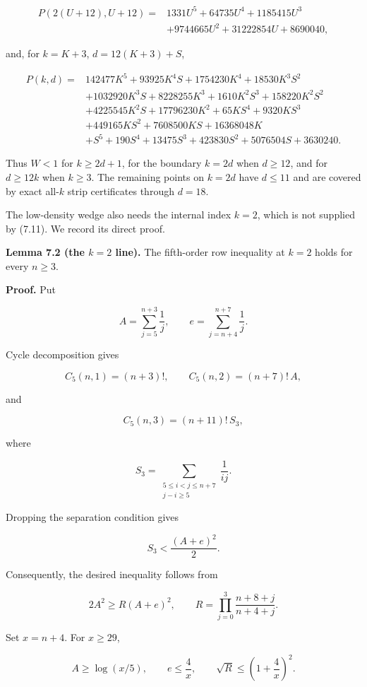 \documentclass[11pt]{article}
\numberwithin{equation}{section}
\begin{document}
\[
\begin{aligned}
P(2(U+12),U+12)
={}&1331U^5+64735U^4+1185415U^3\\
&+9744665U^2+31222854U+8690040,
\end{aligned}
\tag{7.10}
\]

and, for $k=K+3$, $d=12(K+3)+S$,

\[
\begin{aligned}
P(k,d)
={}&142477K^5+93925K^4S+1754230K^4
+18530K^3S^2\\
&+1032920K^3S+8228255K^3+1610K^2S^3
+158220K^2S^2\\
&+4225545K^2S+17796230K^2+65KS^4+9320KS^3\\
&+449165KS^2+7608500KS+16368048K\\
&+S^5+190S^4+13475S^3+423830S^2+5076504S+3630240.
\end{aligned}
\tag{7.11}
\]

Thus $W<1$ for $k\ge2d+1$, for the boundary $k=2d$ when $d\ge12$, and for
$d\ge12k$ when $k\ge3$. The remaining points on $k=2d$ have $d\le11$ and are covered
by exact all-$k$ strip certificates through $d=18$.

The low-density wedge also needs the internal index $k=2$, which is not supplied by
(7.11). We record its direct proof.

\textbf{Lemma 7.2 (the $k=2$ line).} The fifth-order row inequality at $k=2$ holds for every
$n\ge3$.

\textbf{Proof.} Put

\[
A=\sum_{j=5}^{n+3}\frac1j,
\qquad
e=\sum_{j=n+4}^{n+7}\frac1j.
\]

Cycle decomposition gives

\[
C_5(n,1)=(n+3)!,
\qquad
C_5(n,2)=(n+7)!\,A,
\]

and

\[
C_5(n,3)=(n+11)!\,S_3,
\]

where

\[
S_3=\sum_{\substack{5\le i<j\le n+7\\j-i\ge5}}\frac1{ij}.
\]

Dropping the separation condition gives

\[
S_3<\frac{(A+e)^2}{2}.
\]

Consequently, the desired inequality follows from

\[
2A^2\ge R(A+e)^2,
\qquad
R=\prod_{j=0}^{3}\frac{n+8+j}{n+4+j}.
\tag{7.12}
\]

Set $x=n+4$. For $x\ge29$,

\[
A\ge\log(x/5),
\qquad
e\le\frac4x,
\qquad
\sqrt R\le\left(1+\frac4x\right)^2.
\]
\end{document}
